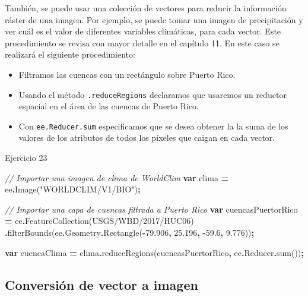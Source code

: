 \documentclass[
  12pt,
  letterpaper,
  twoside]{book}
\newenvironment{Shaded}{\begin{snugshade}}{\end{snugshade}}
\newcommand{\AttributeTok}[1]{\textcolor[rgb]{0.77,0.63,0.00}{#1}}
\newcommand{\CommentTok}[1]{\textcolor[rgb]{0.56,0.35,0.01}{\textit{#1}}}
\newcommand{\FloatTok}[1]{\textcolor[rgb]{0.00,0.00,0.81}{#1}}
\newcommand{\FunctionTok}[1]{\textcolor[rgb]{0.00,0.00,0.00}{#1}}
\newcommand{\KeywordTok}[1]{\textcolor[rgb]{0.13,0.29,0.53}{\textbf{#1}}}
\newcommand{\NormalTok}[1]{#1}
\newcommand{\OperatorTok}[1]{\textcolor[rgb]{0.81,0.36,0.00}{\textbf{#1}}}
\newcommand{\StringTok}[1]{\textcolor[rgb]{0.31,0.60,0.02}{#1}}
\providecommand{\tightlist}{%
  \setlength{\itemsep}{0pt}\setlength{\parskip}{0pt}}
\begin{document}
También, se puede usar una colección de vectores para reducir la información ráster de una imagen. Por ejemplo, se puede tomar una imagen de precipitación y ver cuál es el valor de diferentes variables climáticas, para cada vector. Este procedimiento se revisa con mayor detalle en el capítulo 11. En este caso se realizará el siguiente procedimiento:

\begin{itemize}
\tightlist
\item
  Filtramos las cuencas con un rectángulo sobre Puerto Rico.
\item
  Usando el método \texttt{.reduceRegions} declaramos que usaremos un reductor espacial en el área de las cuencas de Puerto Rico.
\item
  Con \texttt{ee.Reducer.sum} especificamos que se desea obtener la la suma de los valores de los atributos de todos los píxeles que caigan en cada vector.
\end{itemize}

Ejercicio 23

\begin{Shaded}
\begin{Highlighting}[]
\CommentTok{// Importar una imagen de clima de WorldClim}
\KeywordTok{var}\NormalTok{ clima }\OperatorTok{=}\NormalTok{ ee}\OperatorTok{.}\FunctionTok{Image}\NormalTok{(}\StringTok{"WORLDCLIM/V1/BIO"}\NormalTok{)}\OperatorTok{;}

\CommentTok{// Importar una capa de cuencas filtrada a Puerto Rico}
\KeywordTok{var}\NormalTok{ cuencasPuertorRico }\OperatorTok{=}\NormalTok{ ee}\OperatorTok{.}\FunctionTok{FeatureCollection}\NormalTok{(}\StringTok{\textquotesingle{}USGS/WBD/2017/HUC06\textquotesingle{}}\NormalTok{)}
  \OperatorTok{.}\FunctionTok{filterBounds}\NormalTok{(ee}\OperatorTok{.}\AttributeTok{Geometry}\OperatorTok{.}\FunctionTok{Rectangle}\NormalTok{(}\OperatorTok{{-}}\FloatTok{79.906}\OperatorTok{,} \FloatTok{25.196}\OperatorTok{,} \OperatorTok{{-}}\FloatTok{59.6}\OperatorTok{,} \FloatTok{9.776}\NormalTok{))}\OperatorTok{;}

\KeywordTok{var}\NormalTok{ cuencaClima }\OperatorTok{=}\NormalTok{ clima}\OperatorTok{.}\FunctionTok{reduceRegions}\NormalTok{(cuencasPuertorRico}\OperatorTok{,}\NormalTok{ ee}\OperatorTok{.}\AttributeTok{Reducer}\OperatorTok{.}\FunctionTok{sum}\NormalTok{())}\OperatorTok{;}
\end{Highlighting}
\end{Shaded}

\hypertarget{conversiuxf3n-de-vector-a-imagen}{%
\subsection{Conversión de vector a imagen}\label{conversiuxf3n-de-vector-a-imagen}}
\end{document}
